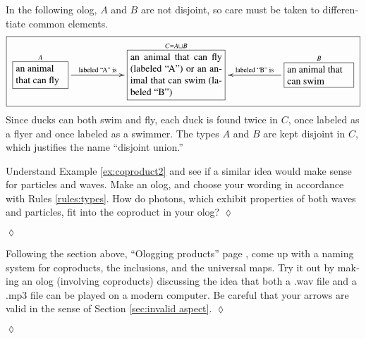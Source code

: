 \documentclass[a4paper]{book}
\def\tn{\textnormal}
\def\rr{\raggedright}
\newcommand{\LA}[2]{\ar[#1]^-{\tn {#2}}}
\newcommand{\LAL}[2]{\ar[#1]_-{\tn {#2}}}
\newcommand{\obox}[3]{\stackrel{#1}{\fbox{\parbox{#2}{#3}}}}
\theoremstyle{myth}
\newtheorem{exampleENG}[envENG]{\begin{english}Example\end{english}}
\newtheorem{excENG}[envENG]{\begin{english}Exercise\end{english}}
\newenvironment{exerciseENG}{\begin{excENG}}{\hspace*{\fill}$\lozenge$\end{excENG}}
\newtheorem{exampleRUS}[envRUS]{\begin{russian}Пример\end{russian}}
\newtheorem{excRUS}[envRUS]{\begin{russian}Упражнение\end{russian}}
\newenvironment{exerciseRUS}{\begin{excRUS}}{\hspace*{\fill}$\lozenge$\end{excRUS}}
\begin{document}
\begin{english}
\begin{exampleENG}\label{ex:coproduct2}
In the following olog, $A$ and $B$ are not disjoint, so care must be taken to differentiate common elements. $$\fbox{\xymatrixnocompile{\obox{A}{.7in}{\rr an animal that can fly}\LA{rr}{labeled “A” is}&&\obox{C=A\sqcup B}{1.3in}{an animal that can fly (labeled “A”) or an animal that can swim (labeled “B”)}&&\obox{B}{.9in}{\rr an animal that can swim}\LAL{ll}{labeled “B” is}}}$$  Since ducks can both swim and fly, each duck is found twice in $C$, once labeled as a flyer and once labeled as a swimmer.  The types $A$ and $B$ are kept disjoint in $C$, which justifies the name “disjoint union.”
\end{exampleENG}

\begin{exampleRUS}\label{ex:coproduct2}
\begin{russian} \end{russian}
\end{exampleRUS}

\begin{exerciseENG}
Understand Example \ref{ex:coproduct2} and see if a similar idea would make sense for particles and waves. Make an olog, and choose your wording in accordance with Rules \ref{rules:types}. How do photons, which exhibit properties of both waves and particles, fit into the coproduct in your olog?
\end{exerciseENG}

\begin{exerciseRUS}
\begin{russian} \end{russian}
\end{exerciseRUS}

\begin{exerciseENG}
Following the section above, “Ologging products” page \pageref{sec:ologging products}, come up with a naming system for coproducts, the inclusions, and the universal maps. Try it out by making an olog (involving coproducts) discussing the idea that both a .wav file and a .mp3 file can be played on a modern computer. Be careful that your arrows are valid in the sense of Section \ref{sec:invalid aspect}.
\end{exerciseENG}

\begin{exerciseRUS}
\begin{russian} \end{russian}
\end{exerciseRUS}


\end{english}
\end{document}
